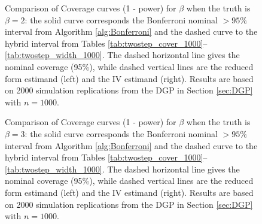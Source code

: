 \begin{figure}
  \centering
  
  \caption{Comparison of Coverage curves (1 - power) for $\beta$ when the truth is $\beta = 2$: the solid curve corresponds the Bonferroni nominal $>95\%$ interval from Algorithm \ref{alg:Bonferroni} and the dashed curve to the hybrid interval from Tables \ref{tab:twostep_cover_1000}--\ref{tab:twostep_width_1000}. The dashed horizontal line gives the nominal coverage (95\%), while dashed vertical lines are the reduced form estimand (left) and the IV estimand (right). Results are based on 2000 simulation replications from the DGP in Section \ref{sec:DGP} with $n = 1000$.}
  \label{fig:2step_2_1000}
\end{figure}

\begin{figure}
  \centering
  
  \caption{Comparison of Coverage curves (1 - power) for $\beta$ when the truth is $\beta = 3$: the solid curve corresponds the Bonferroni nominal $>95\%$ interval from Algorithm \ref{alg:Bonferroni} and the dashed curve to the hybrid interval from Tables \ref{tab:twostep_cover_1000}--\ref{tab:twostep_width_1000}. The dashed horizontal line gives the nominal coverage (95\%), while dashed vertical lines are the reduced form estimand (left) and the IV estimand (right). Results are based on 2000 simulation replications from the DGP in Section \ref{sec:DGP} with $n = 1000$.}
  \label{fig:2step_3_1000}
\end{figure}

